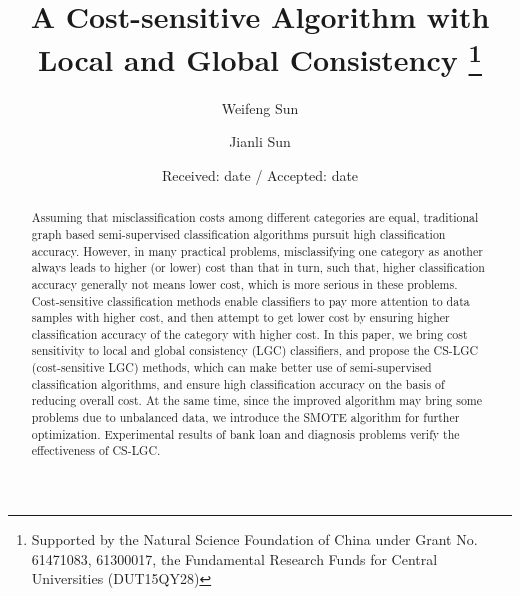 \documentclass{svjour3}                     %
\begin{document}
\title{A Cost-sensitive Algorithm with Local and Global Consistency
\thanks{Supported by the Natural Science Foundation of China under Grant No. 61471083, 61300017, the Fundamental Research Funds for Central Universities (DUT15QY28)}}
\subtitle{}


\author{Weifeng Sun       \and
        Jianli Sun %
}



\date{Received: date / Accepted: date}



\maketitle
\begin{abstract}
Assuming that misclassification costs among different categories are equal, traditional graph based semi-supervised classification algorithms pursuit high classification accuracy. However, in many practical problems, misclassifying one category as another always leads to higher (or lower) cost than that in turn, such that, higher classification accuracy generally not means lower cost, which is more serious in these problems. Cost-sensitive classification methods enable classifiers to pay more attention to data samples with higher cost, and then attempt to get lower cost by ensuring higher classification accuracy of the category with higher cost. In this paper, we bring cost sensitivity to local and global consistency (LGC) classifiers, and propose the CS-LGC (cost-sensitive LGC) methods, which can make better use of semi-supervised classification algorithms, and ensure high classification accuracy on the basis of reducing overall cost. At the same time, since the improved algorithm may bring some problems due to unbalanced data, we introduce the SMOTE algorithm for further optimization. Experimental results of bank loan and diagnosis problems verify the effectiveness of CS-LGC.
\end{abstract}
\end{document}
